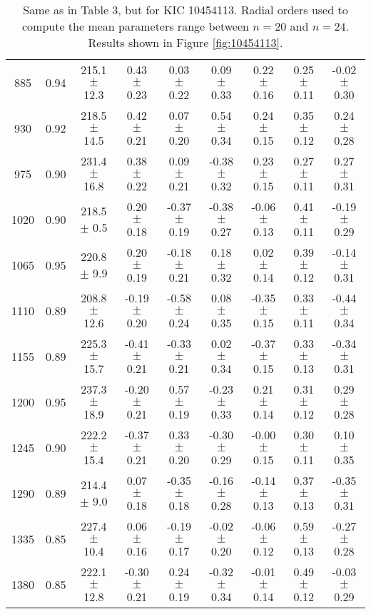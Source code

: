 \documentclass[twocolumn]{aastex61}%
\begin{document}
\begin{table*}[ht]
\begin{tabular}{ccc|ccccc|c}
885 & 0.94 & 215.1 $\pm$ 12.3 & 0.43 $\pm$ 0.23 & 0.03 $\pm$ 0.22 & 0.09 $\pm$ 0.33 & 0.22 $\pm$ 0.16 & 0.25 $\pm$ 0.11 & -0.02 $\pm$ 0.30\\
930 & 0.92 & 218.5 $\pm$ 14.5 & 0.42 $\pm$ 0.21 & 0.07 $\pm$ 0.20 & 0.54 $\pm$ 0.34 & 0.24 $\pm$ 0.15 & 0.35 $\pm$ 0.12 & 0.24 $\pm$ 0.28\\
975 & 0.90 & 231.4 $\pm$ 16.8 & 0.38 $\pm$ 0.22 & 0.09 $\pm$ 0.21 & -0.38 $\pm$ 0.32 & 0.23 $\pm$ 0.15 & 0.27 $\pm$ 0.11 & 0.27 $\pm$ 0.31\\
1020 & 0.90 & 218.5 $\pm$ 0.5 & 0.20 $\pm$ 0.18 & -0.37 $\pm$ 0.19 & -0.38 $\pm$ 0.27 & -0.06 $\pm$ 0.13 & 0.41 $\pm$ 0.11 & -0.19 $\pm$ 0.29\\
1065 & 0.95 & 220.8 $\pm$ 9.9 & 0.20 $\pm$ 0.19 & -0.18 $\pm$ 0.21 & 0.18 $\pm$ 0.32 & 0.02 $\pm$ 0.14 & 0.39 $\pm$ 0.12 & -0.14 $\pm$ 0.31\\
1110 & 0.89 & 208.8 $\pm$ 12.6 & -0.19 $\pm$ 0.20 & -0.58 $\pm$ 0.24 & 0.08 $\pm$ 0.35 & -0.35 $\pm$ 0.15 & 0.33 $\pm$ 0.11 & -0.44 $\pm$ 0.34\\
1155 & 0.89 & 225.3 $\pm$ 15.7 & -0.41 $\pm$ 0.21 & -0.33 $\pm$ 0.21 & 0.02 $\pm$ 0.34 & -0.37 $\pm$ 0.15 & 0.33 $\pm$ 0.13 & -0.34 $\pm$ 0.31\\
1200 & 0.95 & 237.3 $\pm$ 18.9 & -0.20 $\pm$ 0.21 & 0.57 $\pm$ 0.19 & -0.23 $\pm$ 0.33 & 0.21 $\pm$ 0.14 & 0.31 $\pm$ 0.12 & 0.29 $\pm$ 0.28\\
1245 & 0.90 & 222.2 $\pm$ 15.4 & -0.37 $\pm$ 0.21 & 0.33 $\pm$ 0.20 & -0.30 $\pm$ 0.29 & -0.00 $\pm$ 0.15 & 0.30 $\pm$ 0.11 & 0.10 $\pm$ 0.35\\
1290 & 0.89 & 214.4 $\pm$ 9.0 & 0.07 $\pm$ 0.18 & -0.35 $\pm$ 0.18 & -0.16 $\pm$ 0.28 & -0.14 $\pm$ 0.13 & 0.37 $\pm$ 0.13 & -0.35 $\pm$ 0.31\\
1335 & 0.85 & 227.4 $\pm$ 10.4 & 0.06 $\pm$ 0.16 & -0.19 $\pm$ 0.17 & -0.02 $\pm$ 0.20 & -0.06 $\pm$ 0.12 & 0.59 $\pm$ 0.13 & -0.27 $\pm$ 0.28\\
1380 & 0.85 & 222.1 $\pm$ 12.8 & -0.30 $\pm$ 0.21 & 0.24 $\pm$ 0.19 & -0.32 $\pm$ 0.34 & -0.01 $\pm$ 0.14 & 0.49 $\pm$ 0.12 & -0.03 $\pm$ 0.29\\
\end{tabular}
\caption{Same as in Table 3, but for KIC 10454113. Radial orders used to compute the mean parameters range between $n=20$ and $n=24$. Results shown in Figure \ref{fig:10454113}.}\label{tab:10454113}
\end{table*}
\end{document}
